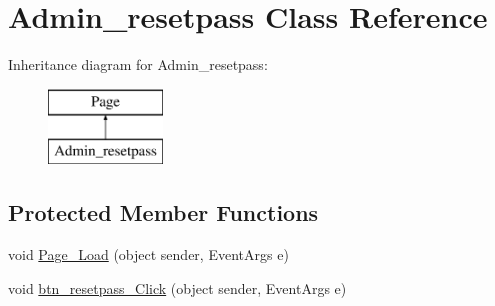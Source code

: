 \hypertarget{class_admin__resetpass}{}\section{Admin\+\_\+resetpass Class Reference}
\label{class_admin__resetpass}
Inheritance diagram for Admin\+\_\+resetpass\+:\begin{figure}[H]
\begin{center}
\leavevmode
\includegraphics[height=2.000000cm]{class_admin__resetpass}
\end{center}
\end{figure}
\subsection*{Protected Member Functions}
\begin{DoxyCompactItemize}
\item 
void \mbox{\hyperlink{class_admin__resetpass_a158be149b7919c7145f6ab7c6acb3ed6}{Page\+\_\+\+Load}} (object sender, Event\+Args e)
\item 
void \mbox{\hyperlink{class_admin__resetpass_a51aa47a260bd5a18be891dbb13763ac8}{btn\+\_\+resetpass\+\_\+\+Click}} (object sender, Event\+Args e)
\end{DoxyCompactItemize}
